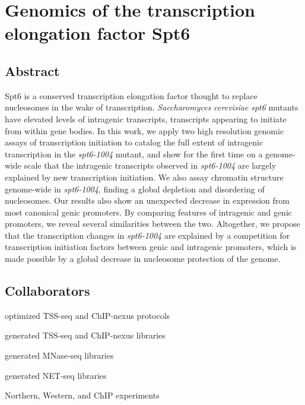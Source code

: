 \chapter{Genomics of the transcription elongation factor Spt6}
\label{chapter:six}

\section{Abstract}

Spt6 is a conserved transcription elongation factor thought to replace nucleosomes in the wake of transcription.
\textit{Saccharomyces cerevisiae} \textit{spt6} mutants have elevated levels of intragenic transcripts, transcripts appearing to initiate from within gene bodies.
In this work, we apply two high resolution genomic assays of transcription initiation to catalog the full extent of intragenic transcription in the \textit{spt6-1004} mutant, and show for the first time on a genome-wide scale that the intragenic transcripts observed in \textit{spt6-1004} are largely explained by new transcription initiation.
We also assay chromatin structure genome-wide in \textit{spt6-1004}, finding a global depletion and disordering of nucleosomes.
Our results also show an unexpected decrease in expression from most canonical genic promoters.
By comparing features of intragenic and genic promoters, we reveal several similarities between the two.
Altogether, we propose that the transcription changes in \textit{spt6-1004} are explained by a competition for transcription initiation factors between genic and intragenic promoters, which is made possible by a global decrease in nucleosome protection of the genome.

\section{Collaborators}

\begin{description}[align=right, labelwidth=5cm, noitemsep]
    \item [Steve Doris] optimized TSS-seq and ChIP-nexus protocols
    \item [] generated TSS-seq and ChIP-nexus libraries
    \item [Olga Viktorovskaya] generated MNase-seq libraries
    \item [Magdalena Murawska] generated NET-seq libraries
    \item [Dan Spatt] Northern, Western, and ChIP experiments
\end{description}

